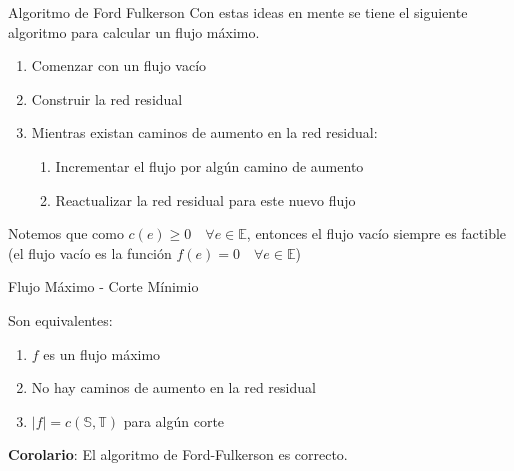 \documentclass[8pt,xcolor={dvipsnames}]{beamer}
\begin{document}
\begin{frame}{Algoritmo de Ford Fulkerson}
	Con estas ideas en mente se tiene el siguiente algoritmo para calcular un flujo m\'aximo.
	\begin{enumerate}
		\item Comenzar con un flujo vac\'io
		\item Construir la red residual
		\item Mientras existan caminos de aumento en la red residual:
		\begin{enumerate}
			\item Incrementar el flujo por alg\'un camino de aumento
			\item Reactualizar la red residual para este nuevo flujo 
		\end{enumerate}
	\end{enumerate} 
	
	Notemos que como $c(e) \geq 0 \quad \forall e \in \mathbb{E}$, entonces el flujo vac\'io siempre es factible (el flujo vac\'io es la funci\'on $f(e) = 0 \quad \forall e \in \mathbb{E}$)
		
\end{frame}

\begin{frame}{Flujo M\'aximo - Corte Mínimio}
    \begin{tcolorbox}[title=Teorema]
        Son equivalentes:
	\begin{enumerate}
		\item $f$ es un flujo m\'aximo
		\item No hay caminos de aumento en la red residual
		\item $|f| = c(\mathbb{S},\mathbb{T})$ para alg\'un corte
	\end{enumerate}  
    \end{tcolorbox}
	 \textbf{Corolario}: El algoritmo de Ford-Fulkerson es correcto.
\end{frame}
\end{document}
